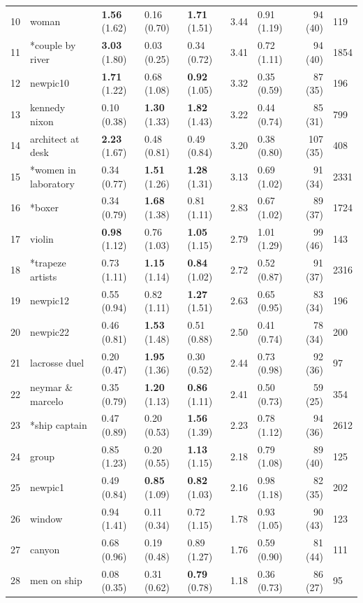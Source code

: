 \documentclass[man,a4paper,mask]{apa6}\usepackage[]{graphicx}\usepackage[]{color}
\begin{document}
\begin{table}
\begin{threeparttable}
\begin{tabularx}{\textwidth}{rllllllr}
   10 & woman & \textbf{1.56} (1.62) & 0.16 (0.70) & \textbf{1.71} (1.51) & 3.44 & 0.91 (1.19) & 94 (40) & 119 \\ 
   11 & *couple by river & \textbf{3.03} (1.80) & 0.03 (0.25) & 0.34 (0.72) & 3.41 & 0.72 (1.11) & 94 (40) & 1854 \\ 
   12 & newpic10 & \textbf{1.71} (1.22) & 0.68 (1.08) & \textbf{0.92} (1.05) & 3.32 & 0.35 (0.59) & 87 (35) & 196 \\ 
   13 & kennedy nixon & 0.10 (0.38) & \textbf{1.30} (1.33) & \textbf{1.82} (1.43) & 3.22 & 0.44 (0.74) & 85 (31) & 799 \\ 
   14 & architect at desk & \textbf{2.23} (1.67) & 0.48 (0.81) & 0.49 (0.84) & 3.20 & 0.38 (0.80) & 107 (35) & 408 \\ 
   15 & *women in laboratory & 0.34 (0.77) & \textbf{1.51} (1.26) & \textbf{1.28} (1.31) & 3.13 & 0.69 (1.02) & 91 (34) & 2331 \\ 
   16 & *boxer & 0.34 (0.79) & \textbf{1.68} (1.38) & 0.81 (1.11) & 2.83 & 0.67 (1.02) & 89 (37) & 1724 \\ 
   17 & violin & \textbf{0.98} (1.12) & 0.76 (1.03) & \textbf{1.05} (1.15) & 2.79 & 1.01 (1.29) & 99 (46) & 143 \\ 
   18 & *trapeze artists & 0.73 (1.11) & \textbf{1.15} (1.14) & \textbf{0.84} (1.02) & 2.72 & 0.52 (0.87) & 91 (37) & 2316 \\ 
   19 & newpic12 & 0.55 (0.94) & 0.82 (1.11) & \textbf{1.27} (1.51) & 2.63 & 0.65 (0.95) & 83 (34) & 196 \\ 
   20 & newpic22 & 0.46 (0.81) & \textbf{1.53} (1.48) & 0.51 (0.88) & 2.50 & 0.41 (0.74) & 78 (34) & 200 \\ 
   21 & lacrosse duel & 0.20 (0.47) & \textbf{1.95} (1.36) & 0.30 (0.52) & 2.44 & 0.73 (0.98) & 92 (36) &  97 \\ 
   22 & neymar \& marcelo & 0.35 (0.79) & \textbf{1.20} (1.13) & \textbf{0.86} (1.11) & 2.41 & 0.50 (0.73) & 59 (25) & 354 \\ 
   23 & *ship captain & 0.47 (0.89) & 0.20 (0.53) & \textbf{1.56} (1.39) & 2.23 & 0.78 (1.12) & 94 (36) & 2612 \\ 
   24 & group & 0.85 (1.23) & 0.20 (0.55) & \textbf{1.13} (1.15) & 2.18 & 0.79 (1.08) & 89 (40) & 125 \\ 
   25 & newpic1 & 0.49 (0.84) & \textbf{0.85} (1.09) & \textbf{0.82} (1.03) & 2.16 & 0.98 (1.18) & 82 (35) & 202 \\ 
   26 & window & 0.94 (1.41) & 0.11 (0.34) & 0.72 (1.15) & 1.78 & 0.93 (1.05) & 90 (43) & 123 \\ 
   27 & canyon & 0.68 (0.96) & 0.19 (0.48) & 0.89 (1.27) & 1.76 & 0.59 (0.90) & 81 (44) & 111 \\ 
   28 & men on ship & 0.08 (0.35) & 0.31 (0.62) & \textbf{0.79} (0.78) & 1.18 & 0.36 (0.73) & 86 (27) &  95 \\ 
   \hline


\end{tabularx}
\end{threeparttable}
\end{table}
\end{document}
